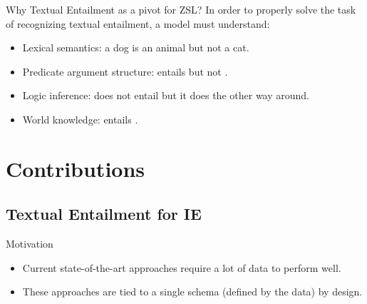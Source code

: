 \documentclass[
    11pt,
    notheorems,
    xcolor={dvipsnames},
    hyperref={
        pdfstartview=FitH, 
        pdftitle={Ikasketa-adibide urriko Informazio-Erauzketa}, 
        pdfauthor={Oscar Sainz Jimenez}, 
        citecolor=secondary, 
    }
]{beamer}
\begin{document}
\begin{frame}
    \begin{block}{Why Textual Entailment as a pivot for ZSL?}
        In order to properly solve the task of recognizing textual entailment, a model must understand:
        \begin{itemize}[<+->]
            \item Lexical semantics: a dog is an animal but not a cat.
            \item Predicate argument structure:  entails  but not .
            \item Logic inference:  does not entail  but it does the other way around.
            \item World knowledge:  entails  .
        \end{itemize}
    \end{block}
\end{frame}

\section{Contributions}

\subsection{Textual Entailment for IE}
\makesubsectiontitlepage

\begin{frame}
    \begin{block}{Motivation}
        \begin{itemize}[<+->]
            \item Current state-of-the-art approaches require a lot of data to perform well.
            \item These approaches are tied to a single schema (defined by the data) by design.
        \end{itemize}
        \blockskip

    \end{block}
\end{frame}
\end{document}
